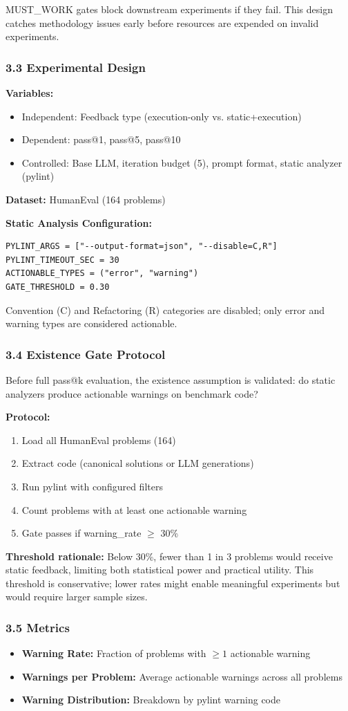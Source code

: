 MUST\_WORK gates block downstream experiments if they fail. This design catches methodology issues early before resources are expended on invalid experiments.

\subsubsection{3.3 Experimental Design}

\textbf{Variables:}
\begin{itemize}
\item Independent: Feedback type (execution-only vs. static+execution)
\item Dependent: pass@1, pass@5, pass@10
\item Controlled: Base LLM, iteration budget (5), prompt format, static analyzer (pylint)
\end{itemize}

\textbf{Dataset:} HumanEval (164 problems)

\textbf{Static Analysis Configuration:}
\begin{verbatim}
PYLINT_ARGS = ["--output-format=json", "--disable=C,R"]
PYLINT_TIMEOUT_SEC = 30
ACTIONABLE_TYPES = ("error", "warning")
GATE_THRESHOLD = 0.30
\end{verbatim}

Convention (C) and Refactoring (R) categories are disabled; only error and warning types are considered actionable.

\subsubsection{3.4 Existence Gate Protocol}

Before full pass@k evaluation, the existence assumption is validated: do static analyzers produce actionable warnings on benchmark code?

\textbf{Protocol:}
\begin{enumerate}
\item Load all HumanEval problems (164)
\item Extract code (canonical solutions or LLM generations)
\item Run pylint with configured filters
\item Count problems with at least one actionable warning
\item Gate passes if warning\_rate $\geq$ 30\%
\end{enumerate}

\textbf{Threshold rationale:} Below 30\%, fewer than 1 in 3 problems would receive static feedback, limiting both statistical power and practical utility. This threshold is conservative; lower rates might enable meaningful experiments but would require larger sample sizes.

\subsubsection{3.5 Metrics}

\begin{itemize}
\item \textbf{Warning Rate:} Fraction of problems with $\geq 1$ actionable warning
\item \textbf{Warnings per Problem:} Average actionable warnings across all problems
\item \textbf{Warning Distribution:} Breakdown by pylint warning code
\end{itemize}
